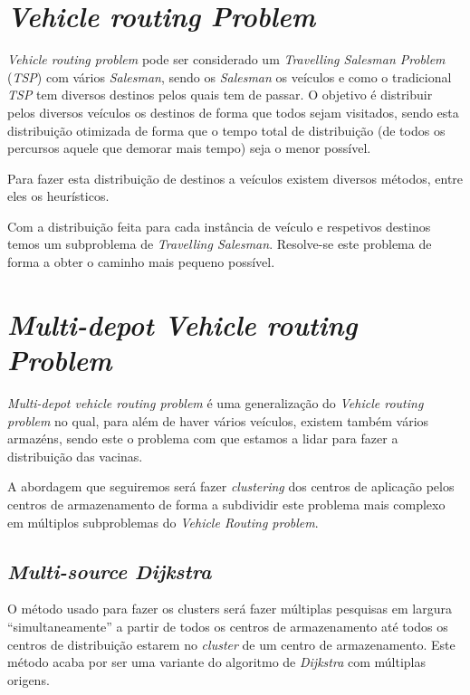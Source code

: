 \documentclass[12pt,a4paper]{report}
\begin{document}
	
	\section{\textit{Vehicle routing Problem}}
	\textit{Vehicle routing problem} pode ser considerado um \textit{Travelling Salesman Problem} (\textit{TSP}) com vários \textit{Salesman}, sendo os \textit{Salesman} os veículos e como o tradicional \textit{TSP} tem diversos destinos pelos quais tem de passar. O objetivo é distribuir pelos diversos veículos os destinos de forma que todos sejam visitados, sendo esta distribuição otimizada de forma que o tempo total de distribuição (de todos os percursos aquele que demorar mais tempo) seja o menor possível. \par
	Para fazer esta distribuição de destinos a veículos existem diversos métodos, entre eles os heurísticos. \par
	Com a distribuição feita para cada instância de veículo e respetivos destinos temos um subproblema de \textit{Travelling Salesman}. Resolve-se este problema de forma a obter o caminho mais pequeno possível.
	
	
	\section{\textit{Multi-depot Vehicle routing Problem}}
	\textit{Multi-depot vehicle routing problem} é uma generalização do \textit{Vehicle routing problem} no qual, para além de haver vários veículos, existem também vários armazéns, sendo este o problema com que estamos a lidar para fazer a distribuição das vacinas. \par
	A abordagem que seguiremos será fazer \textit{clustering} dos centros de aplicação pelos centros de armazenamento de forma a subdividir este problema mais complexo em múltiplos subproblemas do \textit{Vehicle Routing problem}. \par
	
		\subsection{\textit{Multi-source Dijkstra}}
		O método usado para fazer os clusters será fazer múltiplas pesquisas em largura “simultaneamente” a partir de todos os centros de armazenamento até todos os centros de distribuição estarem no \textit{cluster} de um centro de armazenamento. Este método acaba por ser uma variante do algoritmo de \textit{Dijkstra} com múltiplas origens.
\end{document}
